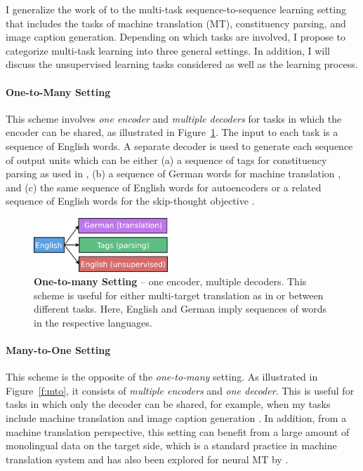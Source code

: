 I generalize the work of \citet{dong15} to the multi-task sequence-to-sequence
learning setting that includes the tasks of machine translation (MT),
constituency parsing, and image caption generation. Depending on which tasks 
are involved, I propose to categorize multi-task \ssl{} learning into three general
settings.
In addition, I will discuss the unsupervised learning tasks considered as well
as the learning process.

\paragraph{One-to-Many Setting}
This scheme involves {\it one encoder} and {\it multiple decoders} for tasks in
which the encoder can be shared, as illustrated in
Figure~\ref{f:otm}. The input to each task is a sequence of
English words. A separate decoder is used to generate each sequence of
output units which can be either (a) a sequence of tags for
constituency parsing as used in \citep{vinyals15grammar}, (b) a
sequence of German words for machine translation \citep{luong15attn},
and (c) the same sequence of English words for autoencoders or a
related sequence of English words for the skip-thought objective
\citep{kiros15skip}.

\begin{figure}[tbh]
\centering
\includegraphics[width=0.45\textwidth, clip=true, trim= 0 0 0
0]{img/6-1_otm}
\caption[One-to-many Setting]{{\bf One-to-many Setting} -- one encoder, multiple decoders. This scheme
is useful for either multi-target translation as
in \cite{dong15} or between different tasks. Here, English and
German imply sequences of words in the respective languages. 
} 
\label{f:otm}
\end{figure}

\paragraph{Many-to-One Setting}
This scheme is the opposite of the {\it one-to-many}
setting. As illustrated in Figure~\ref{f:mto}, it consists of {\it multiple
encoders} and {\it one decoder}. This is useful for tasks in which only the
decoder can be shared, for example, when my tasks include machine translation
and image caption generation \citep{vinyals15caption}. In addition, from a machine
translation perspective, this setting can benefit from a large
amount of monolingual data on the target side, which is a standard
practice in machine translation system and has also been explored
for neural MT by \cite{gulcehre2015using}.

